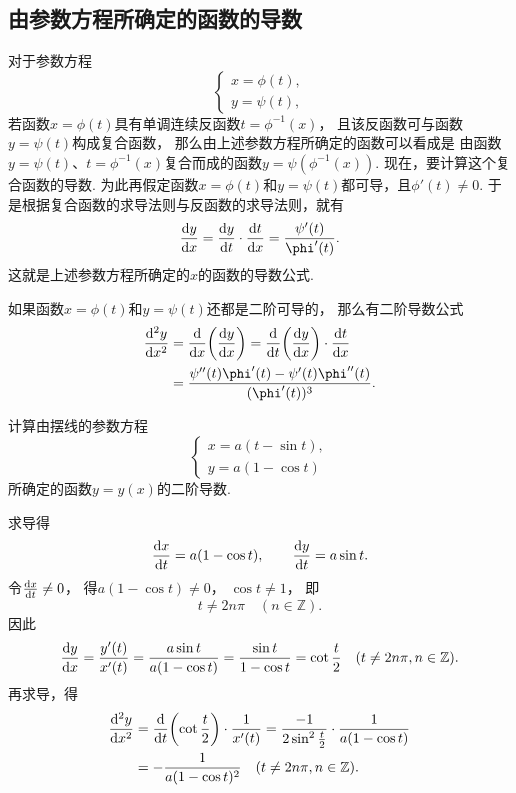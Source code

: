 \subsection{由参数方程所确定的函数的导数}
对于参数方程\[
	\left\{ \begin{array}{l}
		x = \phi(t), \\
		y = \psi(t),
	\end{array} \right.
\]
若函数\(x = \phi(t)\)具有单调连续反函数\(t=\phi^{-1}(x)\)，
且该反函数可与函数\(y = \psi(t)\)构成复合函数，
那么由上述参数方程所确定的函数可以看成是
由函数\(y=\psi(t)\)、\(t=\phi^{-1}(x)\)复合而成的函数\(y=\psi(\phi^{-1}(x))\).
现在，要计算这个复合函数的导数.
为此再假定函数\(x = \phi(t)\)和\(y = \psi(t)\)都可导，且\(\phi'(t) \neq 0\).
于是根据复合函数的求导法则与反函数的求导法则，就有
\begin{equation}\label{equation:导数.参数方程确定的函数的一阶导数}
	\dv{y}{x}
	= \dv{y}{t} \cdot \dv{t}{x}
	= \frac{\psi'(t)}{\phi'(t)}.
\end{equation}
这就是上述参数方程所确定的\(x\)的函数的导数公式.

如果函数\(x = \phi(t)\)和\(y = \psi(t)\)还都是二阶可导的，
那么有二阶导数公式
\begin{equation}\label{equation:导数.参数方程确定的函数的二阶导数}
	\begin{split}
		\dv[2]{y}{x}
		&= \dv{x}(\dv{y}{x})
		= \dv{t}(\dv{y}{x}) \cdot \dv{t}{x} \\
		&= \frac{\psi''(t) \phi'(t) - \psi'(t) \phi''(t)}{(\phi'(t))^3}.
	\end{split}
\end{equation}

\begin{example}
计算由摆线的参数方程\[
	\left\{ \begin{array}{l}
		x=a(t-\sin t), \\
		y=a(1-\cos t)
	\end{array} \right.
\]所确定的函数\(y=y(x)\)的二阶导数.
\begin{solution}
求导得\[
	\dv{x}{t}=a(1-\cos t), \qquad
	\dv{y}{t}=a\sin t.
\]
令\(\dv{x}{t}\neq0\)，
得\(a(1-\cos t)\neq0\)，
\(\cos t\neq1\)，
即\[
	t\neq 2n\pi
	\quad(n\in\mathbb{Z}).
\]
因此\[
	\dv{y}{x}
	=\frac{y'(t)}{x'(t)}
	=\frac{a\sin t}{a(1-\cos t)}
	=\frac{\sin t}{1-\cos t}
	=\cot\frac{t}{2}
	\quad(t\neq 2n\pi,n\in\mathbb{Z}).
\]
再求导，得\begin{align*}
	\dv[2]{y}{x}
	&=\dv{t}(\cot\frac{t}{2})\cdot\frac{1}{x'(t)}
	=\frac{-1}{2\sin^2\frac{t}{2}}
	\cdot\frac{1}{a(1-\cos t)} \\
	&=-\frac{1}{a(1-\cos t)^2}
	\quad(t\neq 2n\pi,n\in\mathbb{Z}).
\end{align*}
\end{solution}
\end{example}

